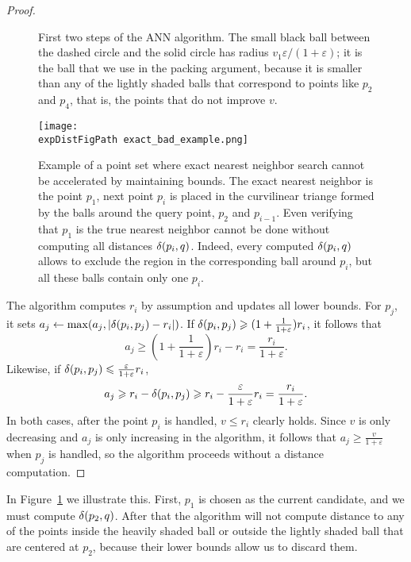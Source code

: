 \documentclass[]{ws-ijcga}
\renewcommand{\leq}{\leqslant}
\renewcommand{\geq}{\geqslant}
\newcommand{\eps}{\varepsilon}
\def \expDistFigPath {pics/}
\begin{document}
\begin{proof}
\begin{figure}[ht!]
\caption{First two steps of the ANN algorithm. 
The small black ball between the dashed circle and the solid circle has radius $v_1 \eps / (1 + \eps)$; it is the ball that we use in the packing argument, because it is smaller than any of the lightly shaded balls that correspond to points like $p_2$ and $p_4$, that is, the points that do not improve $v$.}
\label{fig:ann_illustration}
\end{figure}


\begin{figure}[hb!]
    \texttt{[image: \\expDistFigPath exact\_bad\_example.png]}
    \caption{Example of a point set where exact nearest neighbor search cannot be accelerated by maintaining bounds.
    The exact nearest neighbor is the point $p_1$, next point $p_i$ is placed 
    in the curvilinear triange formed by the balls around the query point, $p_2$ and $p_{i-1}$. Even verifying that $p_1$
    is the true nearest neighbor cannot be done without computing all distances $\delta(p_i,q)$. Indeed, every computed
    $\delta(p_i,q)$ allows to exclude the region in the corresponding ball around $p_i$, but all these balls contain only one $p_i$.}
    \label{fig:exact_bad_example}
\end{figure}


The algorithm computes $r_i$ by assumption and updates
all lower bounds. For $p_j$, it sets $a_j\gets \max (a_j,|\delta(p_i,p_j)-r_i|)$.
If $\dist(p_i,p_j)\geq (1+\frac{1}{1+\eps})r_i$, it follows that 
\[a_j\geq (1+\frac{1}{1+\eps})r_i - r_i = \frac{r_i}{1+\eps}.\]
Likewise, if $\dist(p_i,p_j)\leq\frac{\eps}{1+\eps}r_i$,
\[a_j\geq r_i-\dist(p_i,p_j) \geq r_i - \frac{\eps}{1+\eps}r_i = \frac{r_i}{1+\eps}.\]
In both cases, after the point $p_i$ is handled,
$v\leq r_i$ clearly holds. Since $v$ is only decreasing
and $a_j$ is only increasing in the algorithm,
it follows that $a_j\geq \frac{v}{1+\eps}$ when $p_j$ is handled,
so the algorithm proceeds without a distance computation.
\end{proof}

In Figure~\ref{fig:ann_illustration} we illustrate this. First, $p_1$ is
chosen as the current candidate, and we must compute $\delta(p_2, q)$.
After that the algorithm will not compute
distance to any of the points inside the heavily shaded ball or outside
the lightly shaded ball that are centered at $p_2$,
because their lower bounds allow us to discard them.
\end{document}
